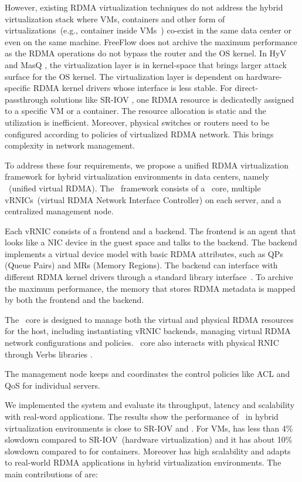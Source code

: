 However, existing RDMA virtualization techniques do not address the hybrid virtualization stack where VMs, containers and other form of virtualizations~(e.g., container inside VMs~\cite{containeronvm}) co-exist in the same data center or even on the same machine.
FreeFlow \cite{kim2019freeflow} does not archive the maximum performance as the RDMA operations do not bypass the router and the OS kernel.
In HyV \cite{pfefferle2015hybrid} and MasQ \cite{he2020masq}, the virtualization layer is in kernel-space that brings larger attack surface for the OS kernel. The virtualization layer is dependent on hardware-specific RDMA kernel drivers whose interface is less stable. 
For direct-passthrough solutions like SR-IOV \cite{sr-iov}, one RDMA resource is dedicatedly assigned to a specific VM or a container. The resource allocation is static and the utilization is inefficient. Moreover, physical switches or routers need to be configured according to policies of virtualized RDMA network. This brings complexity in network management.

To address these four requirements, we propose a unified RDMA virtualization framework for hybrid virtualization environments in data centers, namely \sys~(unified virtual RDMA). The \sys~framework consists of a \sys~core, multiple vRNICs~(virtual RDMA Network Interface Controller) on each server, and a centralized management node.

Each vRNIC consists of a frontend and a backend. The frontend is an agent that looks like a NIC device in the guest space and talks to the backend. The backend implements a virtual device model with basic RDMA attributes, such as QPs (Queue Pairs) and MRs (Memory Regions). The backend can interface with different RDMA kernel drivers through a standard library interface~\cite{verbs}. To archive the maximum performance, the memory that stores RDMA metadata is mapped by both the frontend and the backend. 

The \sys~core is designed to manage both the virtual and physical RDMA resources for the host, including instantiating vRNIC backends, managing virtual RDMA network configurations and policies. \sys~core also interacts with physical RNIC through Verbs libraries \cite{verbs}.

The management node keeps and coordinates the control policies like ACL and QoS for individual servers.

We implemented the \sys system and evaluate its throughput, latency and scalability with real-word applications. The results show the performance of \sys~in hybrid virtualization environments is close to SR-IOV and \native. For VMs, \sys has less than 4\% slowdown compared to SR-IOV~(hardware virtualization) and it has about 10\% slowdown compared to \native for containers. Moreover \sys has high scalability and adapts to real-world RDMA applications in hybrid virtualization environments. The main contributions of \sys are:

